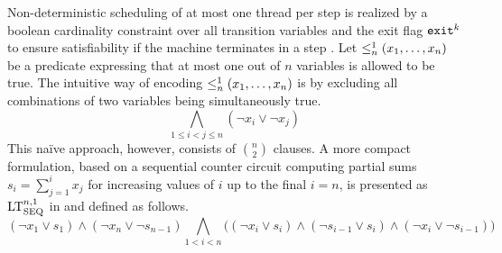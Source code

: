 Non-deterministic scheduling of at most one thread per step is realized by a boolean cardinality constraint over all transition variables and the exit flag $\texttt{exit}^k$ to ensure satisfiability if the machine terminates in a step .
Let $\leq^1_n(x_1, \ldots, x_n)$ be a predicate expressing that at most one out of $n$ variables is allowed to be true.
The intuitive way of encoding $\leq^1_n(x_1, \ldots, x_n)$ is by excluding all combinations of two variables being simultaneously true.
\[
  \bigwedge_{1 \leq i < j \leq n} (\neg x_i \lor \neg x_j)
\]
This na\"ive approach, however, consists of $\binom{n}{2}$  clauses.
A more compact formulation, based on a sequential counter circuit computing partial sums $s_i = \sum^i_{j = 1} x_j$ for increasing values of $i$ up to the final $i = n$, is presented as $\text{LT}^{n, 1}_{\text{SEQ}}$ in \cite{ref:Sinz} and defined as follows.
\[
  (\neg x_1 \lor s_1) \land (\neg x_n \lor \neg s_{n-1}) \bigwedge_{1 < i < n} \big ( (\neg x_i \lor s_i) \land (\neg s_{i-1} \lor s_i) \land (\neg x_i \lor \neg s_{i-1}) \big )
\]

